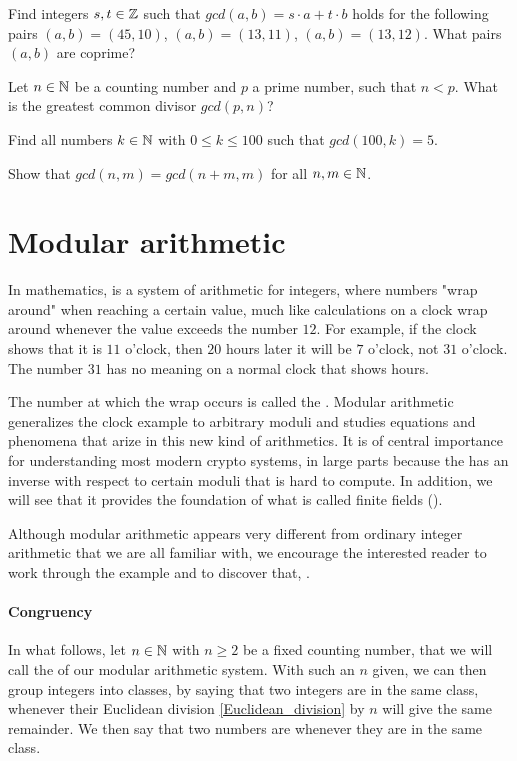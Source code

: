 \begin{exercise}
Find integers $s,t\in\mathbb{Z}$ such that $gcd(a,b)= s\cdot a +t\cdot b$ holds for the following pairs $(a,b) = (45,10)$, $(a,b)=(13,11)$, $(a,b)=(13,12)$. What pairs $(a,b)$ are coprime?
\end{exercise}
\begin{exercise}
Let $n\in \mathbb{N}$ be a counting number and $p$ a prime number, such that $n<p$. What is the greatest common divisor $gcd(p,n)$?
\end{exercise}
\begin{exercise}
Find all numbers $k\in\mathbb{N}$ with $0\leq k \leq 100$ such that $gcd(100,k) = 5$.
\end{exercise}
\begin{exercise}
Show that $gcd(n,m) = gcd(n+m,m)$ for all $n,m\in\mathbb{N}$.
\end{exercise}
\section{Modular arithmetic}
In mathematics,  is a system of arithmetic for integers, where numbers "wrap around" when reaching a certain value, much like calculations on a clock wrap around whenever the value exceeds the number $12$. For example, if the clock shows that it is $11$ o'clock, then $20$ hours later it will be $7$ o'clock, not $31$ o'clock. The number $31$ has no meaning on a normal clock that shows hours. 

The number at which the wrap occurs is called the . Modular arithmetic generalizes the clock example to arbitrary moduli and studies equations and phenomena that arize in this new kind of arithmetics. It is of central importance for understanding most modern crypto systems, in large parts because the  has an inverse with respect to certain moduli that is hard to compute. In addition, we will see that it provides the foundation of what is called finite fields ().

Although modular arithmetic appears very different from ordinary integer arithmetic that we are all familiar with, we encourage the interested reader to work through the example and to discover that, .
\paragraph{Congruency}
In what follows, let $n\in\mathbb{N}$ with $n\geq 2$ be a fixed counting number, that we will call the  of our modular arithmetic system. With such an $n$ given, we can then group integers into classes, by saying that two integers are in the same class, whenever their Euclidean division \ref{Euclidean_division} by $n$ will give the same remainder. We then say that two numbers are  whenever they are in the same class.

